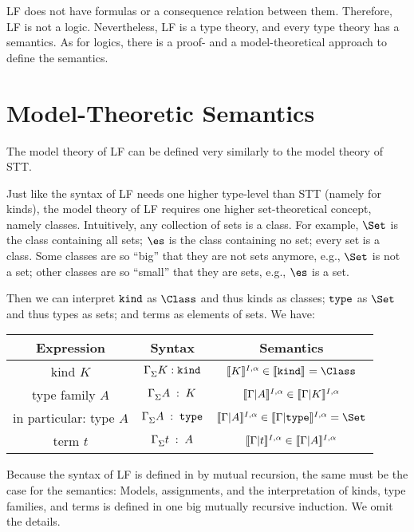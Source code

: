 LF does not have formulas or a consequence relation between them. Therefore, LF is not a logic. Nevertheless, LF is a type theory, and every type theory has a semantics. As for logics, there is a proof- and a model-theoretical approach to define the semantics.

\section{Model-Theoretic Semantics}

The model theory of LF can be defined very similarly to the model theory of STT.

Just like the syntax of LF needs one higher type-level than STT (namely for kinds), the model theory of LF requires one higher set-theoretical concept, namely classes. Intuitively, any collection of sets is a class. For example, $\Set$ is the class containing all sets; $\es$ is the class containing no set; every set is a class. Some classes are so ``big'' that they are not sets anymore, e.g., $\Set$ is not a set; other classes are so ``small'' that they are sets, e.g., $\es$ is a set.

Then we can interpret $\mathtt{kind}$ as $\Class$ and thus kinds as classes; $\mathtt{type}$ as $\Set$ and thus types as sets; and terms as elements of sets. We have:

\begin{center}
\begin{tabular}{|c|c|c|}
\hline
Expression          & Syntax                           & Semantics \\ \hline
kind $K$            & $\Gamma^{}_{\Sigma}K:\mathtt{kind}$    & $\semm{K}{I,\alpha}\in \semm{\KIND}{}=\Class$
    \\[.2cm]
type family $A$     & $\Gamma^{}_{\Sigma}A\;:\;K$  & $\llbracket \Gamma|A\rrbracket^{I,\alpha}\in \llbracket \Gamma|K\rrbracket^{I,\alpha}$ 
    \\[.2cm]
in particular: type $A$
                    & $\Gamma^{}_{\Sigma}A\;:\;\mathtt{type}$ & 
                               $\semcm{\Gamma}{A}{I,\alpha}\in\semcm{\Gamma}{\TYPE}{I,\alpha}=\Set$
    \\[.2cm]
term $t$            & $\Gamma^{}_{\Sigma}t\;:\;A$ & $\llbracket \Gamma|t\rrbracket^{I,\alpha}\in \llbracket \Gamma|A\rrbracket^{I,\alpha}$ \\
\hline
\end{tabular}
\end{center}

Because the syntax of LF is defined in by mutual recursion, the same must be the case for the semantics: Models, assignments, and the interpretation of kinds, type families, and terms is defined in one big mutually recursive induction. We omit the details.

